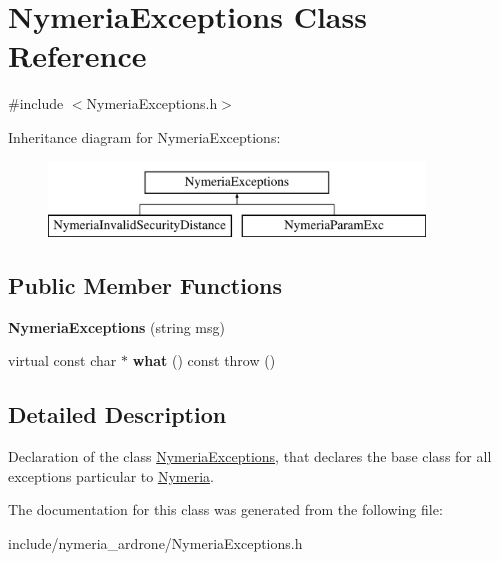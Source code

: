 \hypertarget{classNymeriaExceptions}{\section{\-Nymeria\-Exceptions \-Class \-Reference}
\label{classNymeriaExceptions}
}


{\ttfamily \#include $<$\-Nymeria\-Exceptions.\-h$>$}

\-Inheritance diagram for \-Nymeria\-Exceptions\-:\begin{figure}[H]
\begin{center}
\leavevmode
\includegraphics[height=2.000000cm]{classNymeriaExceptions}
\end{center}
\end{figure}
\subsection*{\-Public \-Member \-Functions}
\begin{DoxyCompactItemize}
\item 
\hypertarget{classNymeriaExceptions_a2ffc37214bfd0d77123c81e4d11f05c3}{{\bfseries \-Nymeria\-Exceptions} (string msg)}\label{classNymeriaExceptions_a2ffc37214bfd0d77123c81e4d11f05c3}

\item 
\hypertarget{classNymeriaExceptions_a3eb752e6b582566cec814e208294b4c6}{virtual const char $\ast$ {\bfseries what} () const   throw ()}\label{classNymeriaExceptions_a3eb752e6b582566cec814e208294b4c6}

\end{DoxyCompactItemize}


\subsection{\-Detailed \-Description}
\-Declaration of the class \hyperlink{classNymeriaExceptions}{\-Nymeria\-Exceptions}, that declares the base class for all exceptions particular to \hyperlink{classNymeria}{\-Nymeria}. 

\-The documentation for this class was generated from the following file\-:\begin{DoxyCompactItemize}
\item 
include/nymeria\-\_\-ardrone/\-Nymeria\-Exceptions.\-h\end{DoxyCompactItemize}

